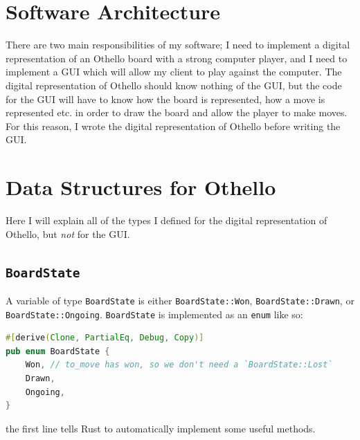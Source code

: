 \documentclass[12pt, a4paper]{report}
\begin{document}
\section{Software Architecture}
There are two main responsibilities of my software; I need to implement a digital representation of an Othello board with a strong computer player, and I need to implement a GUI which will
allow my client to play against the computer. The digital representation of Othello should know nothing of the GUI, but the code for the GUI will have to know how the board is represented,
how a move is represented etc. in order to draw the board and allow the player to make moves. For this reason, I wrote the digital representation of Othello before writing the GUI.

\section{Data Structures for Othello}
Here I will explain all of the types I defined for the digital representation of Othello, but \emph{not} for the GUI.

\subsection{\texttt{BoardState}}
A variable of type \texttt{BoardState} is either \texttt{BoardState::Won}, \texttt{BoardState::Drawn}, or \texttt{BoardState::Ongoing}. \texttt{BoardState} is implemented as an \texttt{enum} like so:

\begin{lstlisting}[language=Rust]
#[derive(Clone, PartialEq, Debug, Copy)]
pub enum BoardState {
    Won, // to_move has won, so we don't need a `BoardState::Lost`
    Drawn,
    Ongoing,
}
\end{lstlisting}

the first line tells Rust to automatically implement some useful methods.
\end{document}
